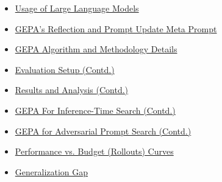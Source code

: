 \documentclass{article} %
\begin{document}
\begin{itemize}
    \item \hyperref[appendix:LLM_usage]{Usage of Large Language Models}
    \item \hyperref[appendix:gepa_meta_prompt]{GEPA's Reflection and Prompt Update Meta Prompt}
    \item \hyperref[appendix:gepa_algorithm_details]{GEPA Algorithm and Methodology Details}
    \item \hyperref[sec:eval_setup_appendix]{Evaluation Setup (Contd.)}
    \item \hyperref[sec:results_analysis_appendix]{Results and Analysis (Contd.)}
    \item \hyperref[sec:inf_time_search_appendix]{GEPA For Inference-Time Search (Contd.)}
    \item \hyperref[sec:adv_prompt_appendix]{GEPA for Adversarial Prompt Search (Contd.)}
    \item \hyperref[appendix_perf_vs_rollout_curves]{Performance vs. Budget (Rollouts) Curves}
    \item \hyperref[appendix:generalization_gap]{Generalization Gap}

\end{itemize}
\end{document}
